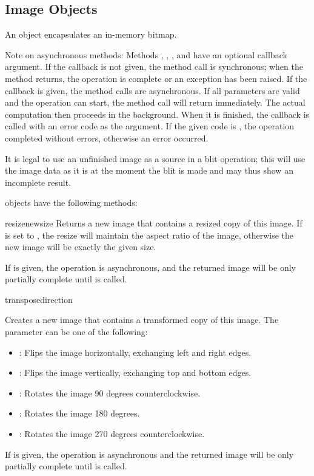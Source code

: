 \subsection{Image Objects}
\label{subsec:image-objects}
An  object encapsulates an in-memory bitmap. 

Note on asynchronous methods: Methods , , 
, and  have an optional callback argument. If the 
callback is not given, the method call is synchronous; when the method
returns, the operation is complete or an exception has been raised. If
the callback is given, the method calls are asynchronous. If all
parameters are valid and the operation can start, the method call will
return immediately.  The actual computation then proceeds in the
background. When it is finished, the callback is called with an error
code as the argument. If the given code is , the operation
completed without errors, otherwise an error occurred.

It is legal to use an unfinished image as a source in a blit operation; this 
will use the image data as it is at the moment the blit is made and may thus 
show an incomplete result.

 objects have the following methods:

\begin{methoddesc}[Image]{resize}{newsize}
\notinfirsted
Returns a new image that contains a resized copy of this image. If 
 is set to , the resize will maintain the 
aspect ratio of the image, otherwise the new image will be exactly the given 
size. 

If  is given, the operation is asynchronous, and the 
returned image will be only partially complete until  is 
called.
\end{methoddesc}

\begin{methoddesc}[Image]{transpose}{direction}
\notinfirsted

Creates a new image that contains a transformed copy of this image. The 
 parameter can be one of the following:

\begin{itemize}
\item {}: Flips the image horizontally, exchanging left and right edges.
\item {}: Flips the image vertically, exchanging top and bottom edges.
\item {}: Rotates the image 90 degrees counterclockwise.
\item {}: Rotates the image 180 degrees.
\item {}: Rotates the image 270 degrees counterclockwise.
\end{itemize}

If  is given, the operation is asynchronous and the 
returned image will be only partially complete until  is 
called.
\end{methoddesc}

